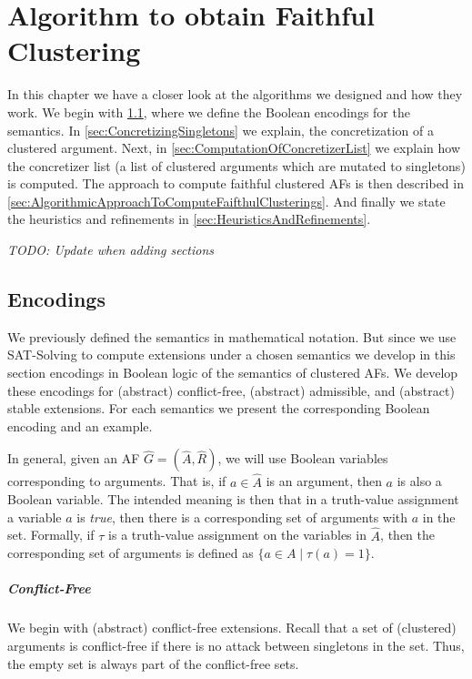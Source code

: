 \chapter{Algorithm to obtain Faithful Clustering}
In this chapter we have a closer look at the algorithms we designed and how they work.
We begin with \cref{sec:Encodings}, where we define the Boolean encodings for the semantics. In \cref{sec:ConcretizingSingletons} we explain, the concretization of a clustered argument. Next, in \cref{sec:ComputationOfConcretizerList} we explain how the concretizer list (a list of clustered arguments which are mutated to singletons) is computed. The approach to compute faithful clustered AFs is then described in \cref{sec:AlgorithmicApproachToComputeFaifthulClusterings}. And finally we state the heuristics and refinements in \cref{sec:HeuristicsAndRefinements}.

\textit{TODO: Update when adding sections}

\section{Encodings}
\label{sec:Encodings}
We previously defined the semantics in mathematical notation. But since we use SAT-Solving to compute extensions under a chosen semantics we develop in this section encodings in Boolean logic of the semantics of clustered AFs. We develop these encodings for (abstract) conflict-free, (abstract) admissible, and (abstract) stable extensions. For each semantics we present the corresponding Boolean encoding and an example.

In general, given an AF $\hat{G}=(\hat{A}, \hat{R})$, we will use Boolean variables corresponding to arguments. That is, if $a \in \hat{A}$ is an argument, then $a$ is also a Boolean variable. The intended meaning is then that in a truth-value assignment a variable $a$ is \emph{true}, then there is a corresponding set of arguments with $a$ in the set. Formally, if $\tau$ is a truth-value assignment on the variables in $\hat{A}$, then the corresponding set of arguments is defined as $\{a \in A \mid \tau(a) = 1\}$.


\paragraph{Conflict-Free} We begin with (abstract) conflict-free extensions. Recall that a set of (clustered) arguments is conflict-free if there is no attack between singletons in the set. Thus, the empty set is always part of the conflict-free sets.

